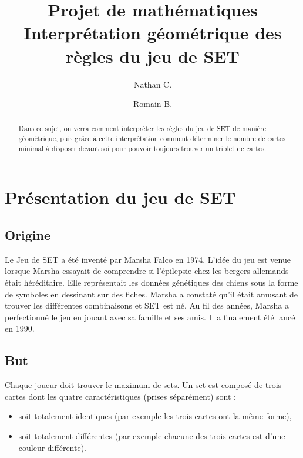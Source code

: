 \documentclass[a4paper,12pt,titlepage]{article}
\title{Projet de mathématiques \\
		\large Interprétation géométrique des règles du jeu de SET}
\author{Nathan C. \and Romain B.}
\date{}
\theoremstyle{plain}
\theoremstyle{definition}
\begin{document}
\maketitle
\tableofcontents
\newpage

\begin{abstract}
Dans ce sujet, on verra comment interpréter les règles du jeu de SET de manière géométrique, 
puis grâce à cette interprétation comment déterminer le nombre de cartes minimal à disposer devant soi pour pouvoir toujours trouver un triplet de cartes.
\end{abstract}


\section{Présentation du jeu de SET}
\subsection{Origine}
Le Jeu de SET a été inventé par Marsha Falco en 1974. L'idée du jeu est venue lorsque Marsha essayait de comprendre si l'épilepsie chez les bergers allemands était héréditaire. 
Elle représentait les données génétiques des chiens sous la forme de symboles en dessinant sur des fiches. 
Marsha a constaté qu'il était amusant de trouver les différentes combinaisons et SET est né. Au fil des années, Marsha a perfectionné le jeu en jouant avec sa famille et ses amis. 
Il a finalement été lancé en 1990.

\subsection{But}
Chaque joueur doit trouver le maximum de sets. Un set est composé de trois cartes dont les quatre caractéristiques (prises séparément) sont : 
\begin{itemize}
\item soit totalement identiques (par exemple les trois cartes ont la même forme),
\item soit totalement différentes (par exemple chacune des trois cartes est d'une couleur différente).
\end{itemize}
\end{document}
